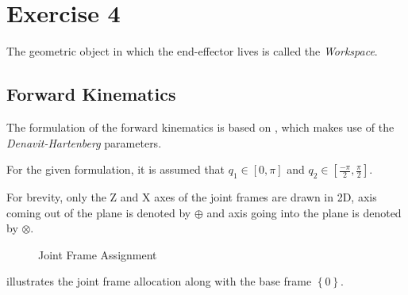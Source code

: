 \section{Exercise 4}
The geometric object in which the end-effector lives is called the \emph{Workspace}.
\subsection{Forward Kinematics}
The formulation of the forward kinematics is based on \cite{Craig}, which makes use of the \emph{Denavit-Hartenberg} parameters.

For the given formulation, it is assumed that $q_1 \in \left[0,\pi\right]$ and $q_2 \in \left[\frac{-\pi}{2},\frac{\pi}{2}\right]$.

For brevity, only the Z and X axes of the joint frames are drawn in 2D, axis coming out of the plane is denoted by $\oplus$ and axis going into the plane is denoted by $\otimes$.

\begin{figure}[h!]
	
	\caption{Joint Frame Assignment}
	\label{fig:frames}
\end{figure}

 illustrates the joint frame allocation along with the base frame $\left\{0\right\}$. 


